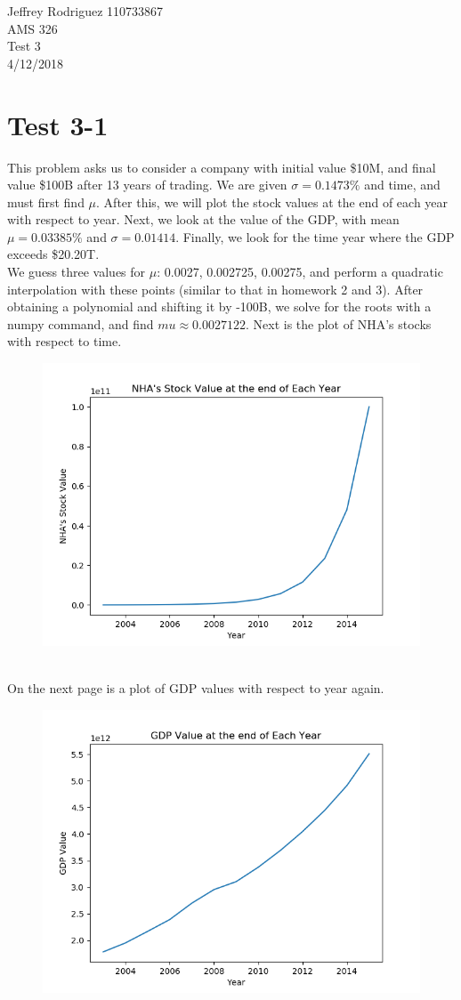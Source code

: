 \documentclass[12pt]{article}
\begin{document}
\begin{center}
Jeffrey Rodriguez 110733867\\AMS 326\\Test 3\\4/12/2018\\

\end{center}
\section*{Test 3-1}
This problem asks us to consider a company with initial value \$10M, and final value \$100B after 13 years of trading. We are given $\sigma = 0.1473\%$ and time, and must first find $\mu$. After this, we will plot the stock values at the end of each year with respect to year. Next, we look at the value of the GDP, with mean $\mu = 0.03385\%$ and $\sigma = 0.01414$. Finally, we look for the time year where the GDP exceeds \$20.20T.
\\We guess three values for $\mu$: 0.0027, 0.002725, 0.00275, and perform a quadratic interpolation with these points (similar to that in homework 2 and 3). After obtaining a polynomial and shifting it by -100B, we solve for the roots with a numpy command, and find $mu\approx0.0027122$. Next is the plot of NHA's stocks with respect to time.
\begin{figure}[h]
	\includegraphics*[scale = .7]{t3plot.png}
\end{figure}
\\On the next page is a plot of GDP values with respect to year again.
\newpage
\begin{figure}[h]
	\includegraphics*[scale = .7]{t3plot2.png}
\end{figure}
\end{document}
